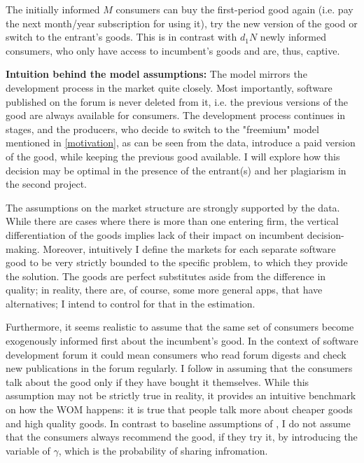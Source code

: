 \documentclass[13pt]{article}
\numberwithin{figure}{section}
\numberwithin{table}{section}
\theoremstyle{indented}
\numberwithin{equation}{section} %
\begin{document}
The initially informed $M$ consumers can buy the first-period good again (i.e. pay the next month/year subscription for using it), try the new version of the good or switch to the entrant's goods. This is in contrast with $d_1N$ newly informed consumers, who only have access to incumbent's goods and are, thus, captive.


\textbf{Intuition behind the model assumptions:} The model mirrors the development process in the market quite closely. Most importantly, software published on the forum is never deleted from it, i.e. the previous versions of the good are always available for consumers. The development process continues in stages, and the producers, who decide to switch to the "freemium" model mentioned in \ref{motivation}, as can be seen from the data, introduce a paid version of the good, while keeping the previous good available. I will explore how this decision may be optimal in the presence of the entrant(s) and her plagiarism in the second project.

The assumptions on the market structure are strongly supported by the data. While there are cases where there is more than one entering firm, the vertical differentiation of the goods implies lack of their impact on incumbent decision-making. Moreover, intuitively I define the markets for each separate software good to be very strictly bounded to the specific problem, to which they provide the solution. The goods are perfect substitutes aside from the difference in quality; in reality, there are, of course, some more general apps, that have alternatives; I intend to control for that in the estimation. 

Furthermore, it seems realistic to assume that the same set of consumers become exogenously informed first about the incumbent's good. In the context of software development forum it could mean consumers who read forum digests and check new publications in the forum regularly. I follow \citet{Campbell2013} in assuming that the consumers talk about the good only if they have bought it themselves. While this assumption may not be strictly true in reality, it provides an intuitive benchmark on how the WOM happens: it is true that people talk more about cheaper goods and high quality goods. In contrast to baseline assumptions of \citet{Campbell2013}, I do not assume that the consumers always recommend the good, if they try it, by introducing the variable of $\gamma$, which is the probability of sharing infromation.
\end{document}

